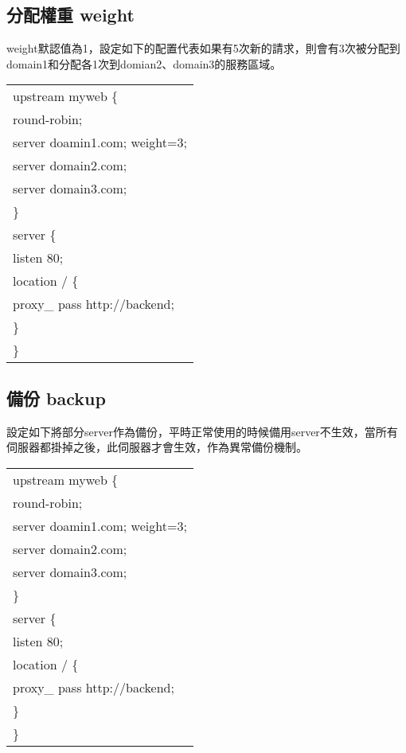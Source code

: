 \subsection{分配權重 weight}
\par
\renewcommand{\baselinestretch}{1} %
\twelve \qquad weight默認值為1，設定如下的配置代表如果有5次新的請求，則會有3次被分配到domain1和分配各1次到domian2、domain3的服務區域。
\par
\begin{center}
\begin{tabular}{||p{15cm}|} %
\hline
upstream myweb \{
\\
\qquad round-robin;
\\
\qquad server doamin1.com; \quad weight=3;
\\
\qquad server domain2.com;
\\
\qquad server domain3.com;
\\
\}
\\
server \{
\\
\qquad listen 80;
\\
\qquad location / \{
\\
\qquad \quad proxy\_ pass \quad http://backend;
\\
\quad \}
\\
\}
\\
\hline
\end{tabular}
\end{center}
\par

\renewcommand{\baselinestretch}{20} %
\subsection{備份 backup}
\par
\renewcommand{\baselinestretch}{1} %
\twelve \qquad 設定如下將部分server作為備份，平時正常使用的時候備用server不生效，當所有伺服器都掛掉之後，此伺服器才會生效，作為異常備份機制。
\par
\begin{center}
\begin{tabular}{||p{15cm}|} %
\hline
upstream myweb \{
\\
\qquad round-robin;
\\
\qquad server doamin1.com; \quad weight=3;
\\
\qquad server domain2.com;
\\
\qquad server domain3.com;
\\
\}
\\
server \{
\\
\qquad listen 80;
\\
\qquad location / \{
\\
\qquad \quad proxy\_ pass \quad http://backend;
\\
\quad \}
\\
\}
\\
\hline
\end{tabular}
\end{center}
\par

